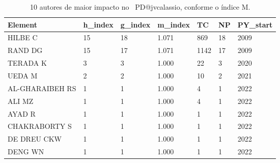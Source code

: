 \begin{table}[htp]
    \centering
    \footnotesize
    \begin{tabular}{|l|l|l|l|l|l|l|}
    \hline
        Element & h\_index & g\_index & m\_index & TC & NP & PY\_start \\ \hline
        HILBE C & 15 & 18 & 1.071 & 869 & 18 & 2009 \\ \hline
        RAND DG & 15 & 17 & 1.071 & 1142 & 17 & 2009 \\ \hline
        TERADA K & 3 & 3 & 1.000 & 22 & 3 & 2020 \\ \hline
        UEDA M & 2 & 2 & 1.000 & 10 & 2 & 2021 \\ \hline
        AL-GHARAIBEH RS & 1 & 1 & 1.000 & 4 & 1 & 2022 \\ \hline
        ALI MZ & 1 & 1 & 1.000 & 4 & 1 & 2022 \\ \hline
        AYAD R & 1 & 1 & 1.000 & 1 & 1 & 2022 \\ \hline
        CHAKRABORTY S & 1 & 1 & 1.000 & 1 & 1 & 2022 \\ \hline
        DE DREU CKW & 1 & 1 & 1.000 & 1 & 1 & 2022 \\ \hline
        DENG WN & 1 & 1 & 1.000 & 1 & 1 & 2022 \\ \hline
    \end{tabular}
    \caption{10 autores de maior impacto no \dataset\ PD@jvcalassio, conforme o índice M.}
    \label{tab:PD@jvcalassio:Author:ImpactoM}
\end{table}

